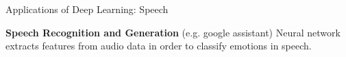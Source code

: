\begin{frame} {Applications of Deep Learning: Speech}
\begin{figure}
\centering
{}
\end{figure}
\textbf{Speech Recognition and Generation} (e.g. google assistant)
Neural network extracts features from audio data in order to classify emotions in speech.
\end{frame}

\endlecture
